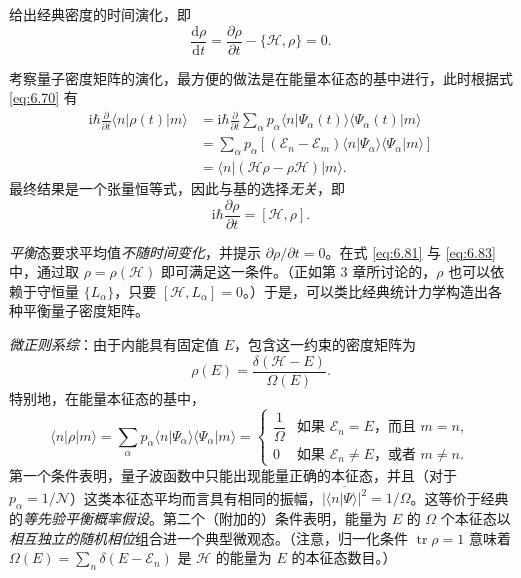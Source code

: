 给出经典密度的时间演化，即
\begin{equation}\label{eq:6.81}
\frac{\mathrm d\rho}{\mathrm dt}=\frac{\partial\rho}{\partial t}-\{\mathscr H,\rho\}=0.
\end{equation}

考察量子密度矩阵的演化，最方便的做法是在能量本征态的基中进行，此时根据式 \eqref{eq:6.70} 有
\begin{equation}\label{eq:6.82}
\begin{aligned}
\mathrm i\hbar\frac{\partial}{\partial t}\langle n|\rho(t)|m\rangle&=\mathrm i\hbar\frac{\partial}{\partial t}\sum_\alpha p_\alpha\langle n|\Psi_\alpha(t)\rangle\langle\Psi_\alpha(t)|m\rangle\\
&=\sum_\alpha p_\alpha\left[(\mathcal E_n-\mathcal E_m)\langle n|\Psi_\alpha\rangle\langle\Psi_\alpha|m\rangle\right]\\
&=\langle n|(\mathscr H\rho-\rho\mathscr H)|m\rangle.
\end{aligned}
\end{equation}
最终结果是一个张量恒等式，因此与基的选择\emph{无关}，即
\begin{equation}\label{eq:6.83}
\mathrm i\hbar\frac{\partial\rho}{\partial t}=[\mathscr H,\rho].
\end{equation}

\emph{平衡}态要求平均值\emph{不随时间变化}，并提示 $\partial\rho/\partial t=0$。在式 \eqref{eq:6.81} 与 \eqref{eq:6.83} 中，通过取 $\rho=\rho(\mathscr H)$ 即可满足这一条件。（正如第 3 章所讨论的，$\rho$ 也可以依赖于守恒量 $\{L_\alpha\}$，只要 $[\mathscr H,L_\alpha]=0$。）于是，可以类比经典统计力学构造出各种平衡量子密度矩阵。

\emph{微正则系综}：由于内能具有固定值 $E$，包含这一约束的密度矩阵为
\begin{equation}\label{eq:6.84}
\rho(E)=\frac{\delta(\mathscr H-E)}{\Omega(E)}.
\end{equation}
特别地，在能量本征态的基中，
\begin{equation}\label{eq:6.85}
\langle n|\rho|m\rangle=\sum_\alpha p_\alpha\langle n|\Psi_\alpha\rangle\langle\Psi_\alpha|m\rangle=\begin{cases}\dfrac1\Omega&\text{如果 }\mathcal E_n=E\text{，而且 }m=n,\\[8pt]0&\text{如果 }\mathcal E_n\ne E\text{，或者 }m\ne n.\end{cases}
\end{equation}
第一个条件表明，量子波函数中只能出现能量正确的本征态，并且（对于 $p_\alpha=1/\mathcal N$）这类本征态平均而言具有相同的振幅，$\overline{|\langle n|\Psi\rangle|^2}=1/\Omega$。这等价于经典的\emph{等先验平衡概率假设}。第二个（附加的）条件表明，能量为 $E$ 的 $\Omega$ 个本征态以\emph{相互独立的随机相位}组合进一个典型微观态。（注意，归一化条件 $\operatorname{tr}\rho=1$ 意味着 $\Omega(E)=\sum_n\delta(E-\mathcal E_n)$ 是 $\mathscr H$ 的能量为 $E$ 的本征态数目。）


